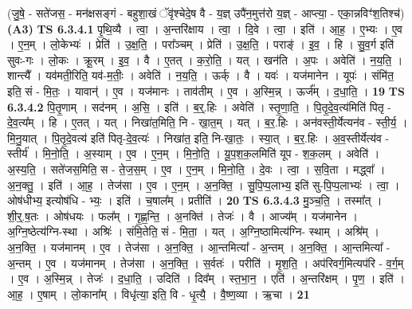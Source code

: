 \documentclass[17pt]{extarticle}
\begin{document}
                  \newline
                      (जु॒षे॒ - सते॑जस॒ - मन॑क्षसङ्गं - बहुशा॒खं ॅवृ॑श्चेदे॒ष वै - य॒ज्ञ् उपै॑न॒मुत्त॑रो य॒ज्ञ् - आप्त्या॒ - एका॒न्नविꣳ॑श॒तिश्च॑)  \textbf{(A3)} \newline \newline
                                \textbf{ TS 6.3.4.1} \newline
                  पृ॒थि॒व्यै । त्वा॒ । अ॒न्तरि॑क्षाय । त्वा॒ । दि॒वे । त्वा॒ । इति॑ । आ॒ह॒ । ए॒भ्यः । ए॒व । ए॒न॒म् । लो॒केभ्यः॑ । प्रेति॑ । उ॒क्ष॒ति॒ । परा᳚ञ्चम् । प्रेति॑ । उ॒क्ष॒ति॒ । पराङ्॑ । इ॒व॒ । हि । सु॒व॒र्ग इति॑ सुवः-गः । लो॒कः । क्रू॒रम् । इ॒व॒ । वै । ए॒तत् । क॒रो॒ति॒ । यत् । खन॑ति । अ॒पः । अवेति॑ । न॒य॒ति॒ । शान्त्यै᳚ । यव॑मती॒रिति॒ यव॑-म॒तीः॒ । अवेति॑ । न॒य॒ति॒ । ऊर्क् । वै । यवः॑ । यज॑मानेन । यूपः॑ । संमि॑त॒ इति॒ सं - मि॒तः॒ । यावान्॑ । ए॒व । यज॑मानः । ताव॑तीम् । ए॒व । अ॒स्मि॒न्न् । ऊर्ज᳚म् । द॒धा॒ति॒ । \textbf{  19} \newline
                  \newline
                                \textbf{ TS 6.3.4.2} \newline
                  पि॒तृ॒णाम् । सद॑नम् । अ॒सि॒ । इति॑ । ब॒र्॒.हिः । अवेति॑ । स्तृ॒णा॒ति॒ । पि॒तृ॒दे॒व॒त्य॑मिति॑ पितृ - दे॒व॒त्य᳚म् । हि । ए॒तत् । यत् । निखा॑त॒मिति॒ नि - खा॒त॒म् । यत् । ब॒र॒.हिः । अन॑वस्ती॒र्येत्यन॑व - स्ती॒र्य॒ । मि॒नु॒यात् । पि॒तृ॒दे॒वत्य॑ इति॑ पितृ-दे॒व॒त्यः॑ । निखा॑त॒ इति॒ नि-खा॒तः॒ । स्या॒त् । ब॒र॒.हिः । अ॒व॒स्तीर्येत्य॑व - स्तीर्य॑ । मि॒नो॒ति॒ । अ॒स्याम् । ए॒व । ए॒न॒म् । मि॒नो॒ति॒ । यू॒प॒श॒क॒लमिति॑ यूप - श॒क॒लम् । अवेति॑ । अ॒स्य॒ति॒ । सते॑जस॒मिति॒ स - ते॒ज॒स॒म् । ए॒व । ए॒न॒म् । मि॒नो॒ति॒ । दे॒वः । त्वा॒ । स॒वि॒ता । मद्ध्वा᳚ । अ॒न॒क्तु॒ । इति॑ । आ॒ह॒ । तेज॑सा । ए॒व । ए॒न॒म् । अ॒न॒क्ति॒ । सु॒पि॒प्प॒लाभ्य॒ इति॑ सु-पि॒प्प॒लाभ्यः॑ । त्वा॒ । ओष॑धीभ्य॒ इत्योष॑धि - भ्यः॒ । इति॑ । च॒षाल᳚म् । प्रतीति॑ । \textbf{  20} \newline
                  \newline
                                \textbf{ TS 6.3.4.3} \newline
                  मु॒ञ्च॒ति॒ । तस्मा᳚त् । शी॒र्॒.ष॒तः । ओष॑धयः । फल᳚म् । गृ॒ह्ण॒न्ति॒ । अ॒नक्ति॑ । तेजः॑ । वै । आज्य᳚म् । यज॑मानेन । अ॒ग्नि॒ष्ठेत्य॑ग्नि-स्था । अश्रिः॑ । संमि॒तेति॒ सं - मि॒ता॒ । यत् । अ॒ग्नि॒ष्ठामित्य॑ग्नि- स्थाम् । अश्रि᳚म् । अ॒न॒क्ति॒ । यज॑मानम् । ए॒व । तेज॑सा । अ॒न॒क्ति॒ । आ॒न्तमित्या᳚ - अ॒न्तम् । अ॒न॒क्ति॒ । आ॒न्तमित्या᳚ - अ॒न्तम् । ए॒व । यज॑मानम् । तेज॑सा । अ॒न॒क्ति॒ । स॒र्वतः॑ । परीति॑ । मृ॒श॒ति॒ । अप॑रिवर्ग॒मित्यप॑रि - व॒र्ग॒म् । ए॒व । अ॒स्मि॒न्न् । तेजः॑ । द॒धा॒ति॒ । उदिति॑ । दिव᳚म् । स्त॒भा॒न॒ । एति॑ । अ॒न्तरि॑क्षम् । पृ॒ण॒ । इति॑ । आ॒ह॒ । ए॒षाम् । लो॒काना᳚म् । विधृ॑त्या॒ इति॒ वि - धृ॒त्यै॒ । वै॒ष्ण॒व्या । ऋ॒चा । \textbf{  21} \newline
\end{document}
